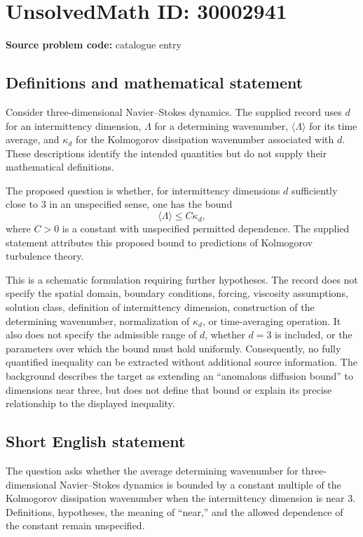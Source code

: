 \documentclass[11pt]{article}
\begin{document}
\section*{UnsolvedMath ID: 30002941}
\textbf{Source problem code:} catalogue entry
\subsection{Definitions and mathematical statement}
Consider three-dimensional Navier--Stokes dynamics. The supplied record uses \(d\) for an intermittency dimension, \(\Lambda\) for a determining wavenumber, \(\langle\Lambda\rangle\) for its time average, and \(\kappa_d\) for the Kolmogorov dissipation wavenumber associated with \(d\). These descriptions identify the intended quantities but do not supply their mathematical definitions.

The proposed question is whether, for intermittency dimensions \(d\) sufficiently close to \(3\) in an unspecified sense, one has the bound
\[
\langle\Lambda\rangle\leq C\kappa_d,
\]
where \(C>0\) is a constant with unspecified permitted dependence. The supplied statement attributes this proposed bound to predictions of Kolmogorov turbulence theory.

This is a schematic formulation requiring further hypotheses. The record does not specify the spatial domain, boundary conditions, forcing, viscosity assumptions, solution class, definition of intermittency dimension, construction of the determining wavenumber, normalization of \(\kappa_d\), or time-averaging operation. It also does not specify the admissible range of \(d\), whether \(d=3\) is included, or the parameters over which the bound must hold uniformly. Consequently, no fully quantified inequality can be extracted without additional source information. The background describes the target as extending an ``anomalous diffusion bound'' to dimensions near three, but does not define that bound or explain its precise relationship to the displayed inequality.
\subsection{Short English statement}
The question asks whether the average determining wavenumber for three-dimensional Navier--Stokes dynamics is bounded by a constant multiple of the Kolmogorov dissipation wavenumber when the intermittency dimension is near \(3\). Definitions, hypotheses, the meaning of ``near,'' and the allowed dependence of the constant remain unspecified.
\end{document}
